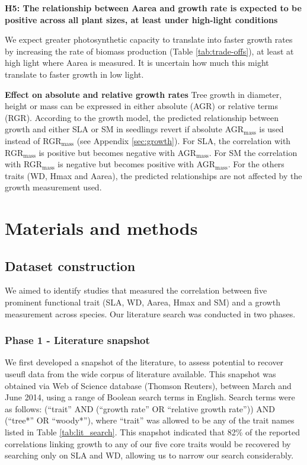 \documentclass[a4paper]{article}\usepackage[]{graphicx}\usepackage[]{color}
\begin{document}
\textbf{H5: The relationship between Aarea and growth rate is expected to be positive across all plant sizes, at least under high-light conditions}

We expect greater photosynthetic capacity to translate into faster growth rates by increasing the rate of biomass production (Table \ref{tab:trade-offs}), at least at high light where Aarea is measured. It is uncertain how much this might translate to faster growth in low light.

\textbf{Effect on absolute and relative growth rates}
Tree growth in diameter, height or mass can be expressed in either absolute (AGR) or relative terms (RGR). According to the growth model, the predicted relationship between growth and either SLA or SM in seedlings revert if absolute AGR$_\textrm{mass}$ is used instead of RGR$_\textrm{mass}$ (see Appendix \ref{sec:growth}). For SLA, the correlation with RGR$_\textrm{mass}$ is positive but becomes negative with AGR$_\textrm{mass}$. For SM the correlation with RGR$_\textrm{mass}$ is negative but becomes positive with AGR$_\textrm{mass}$. For the others traits (WD, Hmax and Aarea), the predicted relationships are not affected by the growth measurement used.


\section*{Materials and methods}\label{material-and-methods}

\subsection*{Dataset construction}

We aimed to identify studies that measured the correlation between five prominent functional trait (SLA, WD, Aarea, Hmax and SM) and a growth measurement across species. Our literature search was conducted in two phases.

\subsubsection*{Phase 1 - Literature snapshot}\label{literature-snapshot}

We first developed a snapshot of the literature, to assess potential to recover useufl data from the wide corpus of literature available. This snapshot was obtained via Web of Science database (Thomson Reuters), between March and June 2014, using a range of Boolean search terms in English. Search terms were as follows: (``trait'' AND (``growth rate'' OR ``relative growth rate'')) AND (``tree*'' OR ``woody*''), where ``trait'' was allowed to be any of the trait names listed in Table \ref{tab:lit_search}. This snapshot indicated that 82\% of the reported correlations linking growth to any of our five core traits would be recovered by searching only on SLA and WD, allowing us to narrow our search considerably.
\end{document}
